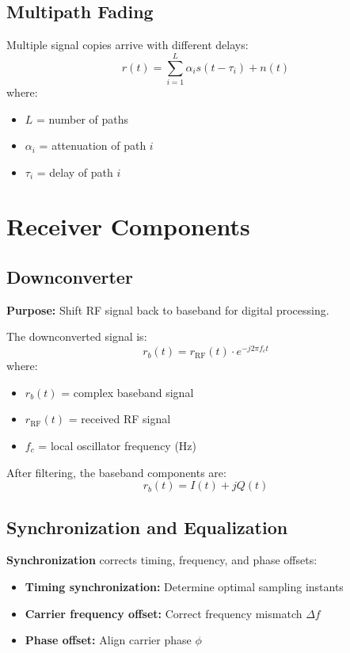 \subsection{Multipath Fading}

Multiple signal copies arrive with different delays:
\begin{equation}
r(t) = \sum_{i=1}^{L} \alpha_i s(t - \tau_i) + n(t)
\end{equation}
where:
\begin{itemize}
\item $L$ = number of paths
\item $\alpha_i$ = attenuation of path $i$
\item $\tau_i$ = delay of path $i$
\end{itemize}

\section{Receiver Components}

\subsection{Downconverter}

\textbf{Purpose:} Shift RF signal back to baseband for digital processing.

The downconverted signal is:
\begin{equation}
r_b(t) = r_{\mathrm{RF}}(t) \cdot e^{-j2\pi f_c t}
\end{equation}
where:
\begin{itemize}
\item $r_b(t)$ = complex baseband signal
\item $r_{\mathrm{RF}}(t)$ = received RF signal
\item $f_c$ = local oscillator frequency (Hz)
\end{itemize}

After filtering, the baseband components are:
\begin{equation}
r_b(t) = I(t) + jQ(t)
\end{equation}

\subsection{Synchronization and Equalization}

\textbf{Synchronization} corrects timing, frequency, and phase offsets:
\begin{itemize}
\item \textbf{Timing synchronization:} Determine optimal sampling instants
\item \textbf{Carrier frequency offset:} Correct frequency mismatch $\Delta f$
\item \textbf{Phase offset:} Align carrier phase $\phi$
\end{itemize}

